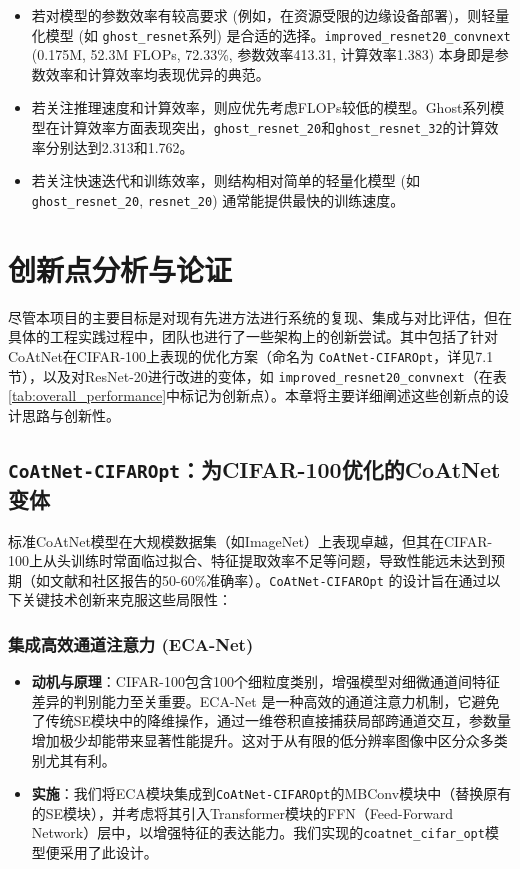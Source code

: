 \documentclass[a4paper]{article}
\begin{document}
\begin{description}
\begin{enumerate}
\begin{itemize}
            \item 若对模型的参数效率有较高要求 (例如，在资源受限的边缘设备部署)，则轻量化模型 (如 \texttt{ghost\_resnet}系列) 是合适的选择。\texttt{improved\_resnet20\_convnext} (0.175M, 52.3M FLOPs, 72.33\%, 参数效率413.31, 计算效率1.383) 本身即是参数效率和计算效率均表现优异的典范。
            \item 若关注推理速度和计算效率，则应优先考虑FLOPs较低的模型。Ghost系列模型在计算效率方面表现突出，\texttt{ghost\_resnet\_20}和\texttt{ghost\_resnet\_32}的计算效率分别达到2.313和1.762。
            \item 若关注快速迭代和训练效率，则结构相对简单的轻量化模型 (如 \texttt{ghost\_resnet\_20}, \texttt{resnet\_20}) 通常能提供最快的训练速度。
        \end{itemize}
\end{enumerate}

\section{创新点分析与论证}
尽管本项目的主要目标是对现有先进方法进行系统的复现、集成与对比评估，但在具体的工程实践过程中，团队也进行了一些架构上的创新尝试。其中包括了针对CoAtNet在CIFAR-100上表现的优化方案（命名为 \texttt{CoAtNet-CIFAROpt}，详见7.1节），以及对ResNet-20进行改进的变体，如 \texttt{improved\_resnet20\_convnext}（在表\ref{tab:overall_performance}中标记为创新点）。本章将主要详细阐述这些创新点的设计思路与创新性。

\subsection{\texttt{CoAtNet-CIFAROpt}：为CIFAR-100优化的CoAtNet变体}

标准CoAtNet模型在大规模数据集（如ImageNet）上表现卓越，但其在CIFAR-100上从头训练时常面临过拟合、特征提取效率不足等问题，导致性能远未达到预期（如文献和社区报告的50-60\%准确率）。\texttt{CoAtNet-CIFAROpt} 的设计旨在通过以下关键技术创新来克服这些局限性：

\subsubsection{集成高效通道注意力 (ECA-Net)}
\begin{itemize}
    \item \textbf{动机与原理}：CIFAR-100包含100个细粒度类别，增强模型对细微通道间特征差异的判别能力至关重要。ECA-Net 是一种高效的通道注意力机制，它避免了传统SE模块中的降维操作，通过一维卷积直接捕获局部跨通道交互，参数量增加极少却能带来显著性能提升。这对于从有限的低分辨率图像中区分众多类别尤其有利。
    \item \textbf{实施}：我们将ECA模块集成到\texttt{CoAtNet-CIFAROpt}的MBConv模块中（替换原有的SE模块），并考虑将其引入Transformer模块的FFN（Feed-Forward Network）层中，以增强特征的表达能力。我们实现的\texttt{coatnet\_cifar\_opt}模型便采用了此设计。
\end{itemize}


\end{description}
\end{document}
